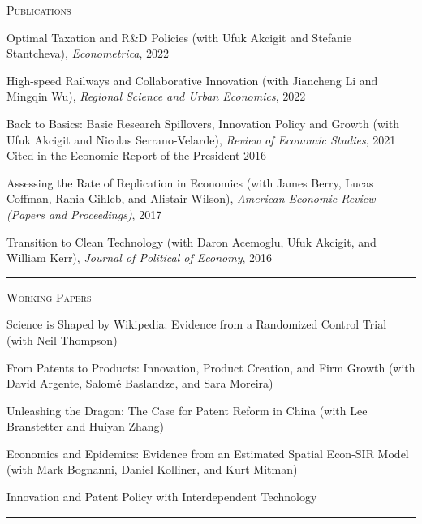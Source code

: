 \documentclass{article}
\begin{document}
\parbox{\textwidth}{
\parbox[t]{0.28\textwidth}{ \raggedright \noindent \textsc{ Publications } }
\parbox[t]{0.72\textwidth}{ \raggedright

Optimal Taxation and R\&D Policies (with Ufuk Akcigit and Stefanie Stantcheva), \textit{Econometrica}, 2022
\vspace{0.27cm}

High-speed Railways and Collaborative Innovation (with Jiancheng Li and Mingqin Wu), \textit{Regional Science and Urban Economics}, 2022
\vspace{0.27cm}

Back to Basics: Basic Research Spillovers, Innovation Policy and Growth (with Ufuk Akcigit and Nicolas Serrano-Velarde), \textit{Review of Economic Studies}, 2021  \\
 Cited in the \href{https://www.gpo.gov/fdsys/pkg/ERP-2016/pdf/ERP-2016.pdf}{Economic Report of the President 2016}
\vspace{0.27cm}

Assessing the Rate of Replication in Economics (with James Berry, Lucas Coffman, Rania Gihleb, and Alistair Wilson), \textit{American Economic Review (Papers and Proceedings)}, 2017
\vspace{0.27cm}

Transition to Clean Technology (with Daron Acemoglu, Ufuk Akcigit, and William Kerr), \textit{Journal of Political of Economy}, 2016
\vspace{0.27cm}

}
\textcolor{light-gray}{\hrule}
}
\vspace{0.3cm}

\parbox{\textwidth}{
\parbox[t]{0.28\textwidth}{ \raggedright \noindent \textsc{ Working Papers } }
\parbox[t]{0.72\textwidth}{ \raggedright

Science is Shaped by Wikipedia: Evidence from a Randomized Control Trial (with Neil Thompson)
\vspace{0.27cm}

From Patents to Products: Innovation, Product Creation, and Firm Growth (with David Argente, Salomé Baslandze, and Sara Moreira)
\vspace{0.27cm}

Unleashing the Dragon: The Case for Patent Reform in China (with Lee Branstetter and Huiyan Zhang)
\vspace{0.27cm}

Economics and Epidemics: Evidence from an Estimated Spatial Econ-SIR Model (with Mark Bognanni, Daniel Kolliner, and Kurt Mitman)
\vspace{0.27cm}

Innovation and Patent Policy with Interdependent Technology
\vspace{0.27cm}

}
\textcolor{light-gray}{\hrule}
}
\vspace{0.3cm}
\end{document}
